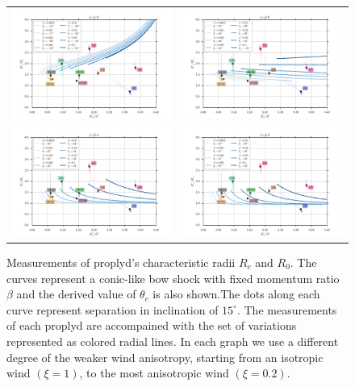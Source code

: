 

 

\begin{figure}
\begin{tabular}{cc}
\includegraphics[width=0.48\linewidth]{../../read-shapes/conic_xi-10} & \includegraphics[width=0.48\linewidth]{../../read-shapes/conic_xi-08} \\
\includegraphics[width=0.48\linewidth]{../../read-shapes/conic_xi-04} & \includegraphics[width=0.48\linewidth]{../../read-shapes/conic_xi-02} 
\end{tabular}
\label{fig:conic-xi}
\caption{Measurements of proplyd's characteristic radii $R_c$ and $R_0$. The curves represent a conic-like bow shock with 
fixed momentum ratio $\beta$ and the derived value of $\theta_c$ is also shown.The dots along each curve represent separation in inclination of 
$15^\circ$. The measurements of each proplyd are accompained with the set of variations represented as colored radial lines. In 
each graph we use a different degree of the weaker wind anisotropy, starting from an isotropic wind $(\xi=1)$, to the most anisotropic wind
$(\xi=0.2)$.}
\end{figure}

